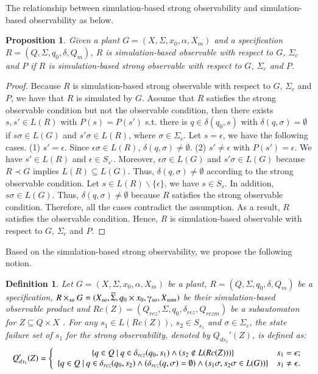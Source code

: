 \documentclass[12pt,draftcls,onecolumn]{IEEEtran}
\newtheorem{Proposition}{Proposition}
\newtheorem{Definition}{Definition}
\begin{document}
The relationship between simulation-based strong observability and
simulation-based observability as below.
\begin{Proposition}
Given a plant $G =(X,\Sigma,x_{0},\alpha,X_{m})$ and a
specification $R =(Q,\Sigma,q_{0},\delta,Q_{m})$, $R$ is
simulation-based observable with respect to $G$, $\Sigma_{c}$ and
$P$ if $R$ is simulation-based strong observable with respect to
$G$, $\Sigma_{c}$ and $P$.
\end{Proposition}

\begin{proof}
Because $R$ is simulation-based strong observable with respect to
$G$, $\Sigma_{c}$ and $P$, we have that $R$ is simulated by $G$.
Assume that $R$ satisfies the strong observable condition but not
the observable condition, then there exists $s, s' \in L(R)$ with
$P(s)=P(s')$ s.t. there is $q \in \delta(q_0, s)$ with $\delta(q,
\sigma)=\emptyset$ if $s\sigma \in L(G)$ and $s'\sigma \in L(R)$,
where $\sigma \in \Sigma_{c}$. Let $s = \epsilon$, we have the
following cases. (1) $s'=\epsilon$. Since $\epsilon\sigma \in
L(R)$, $\delta(q, \sigma) \neq \emptyset$. (2) $s' \neq \epsilon$
with $P(s')=\epsilon$. We have $s' \in L(R)$ and $\epsilon \in
S_{s'}$. Moreover, $\epsilon\sigma \in L(G)$ and $s'\sigma \in
L(G)$ because $R \prec G$ implies $L(R) \subseteq L(G)$. Thus,
$\delta(q, \sigma) \neq \emptyset$ according to the strong
observable condition. Let $s \in L(R) \backslash \{\epsilon\}$, we
have $s \in S_{s}$. In addition, $s\sigma \in L(G)$. Thus,
$\delta(q, \sigma) \neq \emptyset$ because $R$ satisfies the
strong observable condition. Therefore, all the cases contradict
the assumption. As a result, $R$ satisfies the observable
condition. Hence, $R$ is simulation-based observable with respect
to $G$, $\Sigma_c$ and $P$.
\end{proof}

Based on the simulation-based strong observability, we propose the
following notion.

\begin{Definition}
Let $G =(X,\Sigma,x_{0},\alpha,X_{m})$ be a plant, $R
=(Q,\Sigma,q_{0},\delta,Q_{m})$ be a specification, $R \times_{so}
G = (X_{so}, \overline{\Sigma}, q_0 \times x_0, \gammaup_{so},
X_{som})$ be their simulation-based observable product and $Rc(Z)
=(Q_{rcz},\Sigma,q_{0},\delta_{rcz},Q_{rczm})$ be a subautomaton
for $Z \subseteq Q \times X$ . For any $s_1 \in L(Rc(Z))$, $s_2
\in S_{s_1}$ and $\sigma \in \Sigma_{c}$, the state failure set of
$s_1$ for the strong observability, denoted by $Q_{ds_1}'(Z)$, is
defined as:
\[
Q_{ds_1}'(Z) = \left\{ {\begin{array}{*{20}c}
  \{q \in Q ~|~ q \in \delta_{rcz}(q_0, s_1) \wedge (s_2 \notin L(Rc(Z)))\} &{s_1=\epsilon};  \\
  \{q \in Q ~|~ q \in \delta_{rcz}(q_0, s_2) \wedge (\delta_{rcz}(q, \sigma) = \emptyset) \wedge (s_1\sigma, s_2\sigma \in L(G))\} & {s_1 \neq \epsilon}.  \\
\end{array}} \right.
\]
\end{Definition}
\end{document}
